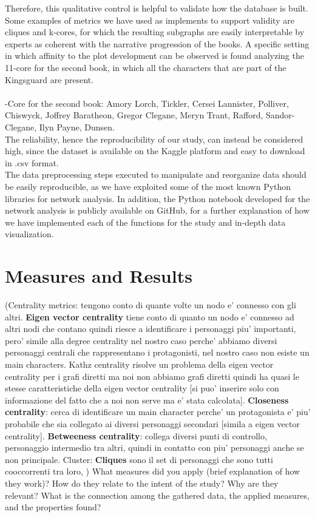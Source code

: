 \documentclass[12pt, a4paper]{article}
\begin{document}
Therefore, this qualitative control is helpful to validate how the database is built.
Some examples of metrics we have used as implements to support validity are cliques and k-cores, for which the resulting subgraphs are easily interpretable by experts as coherent with the narrative progression of the books.
A specific setting in which affinity to the plot development can be observed is found analyzing the 11-core for the second book, in which all the characters that are part of the Kingsguard are present. \\
\\
{\fontsize{9}{11}-Core for the second book: Amory Lorch, Tickler, Cersei Lannister, Polliver, Chiswyck, Joffrey Baratheon, Gregor Clegane, Meryn Trant, Rafford, Sandor-Clegane, Ilyn Payne, Dunsen.
}
\\

The reliability, hence the reproducibility of our study, can instead be considered high, since the dataset is available on the Kaggle platform and easy to download in .csv format.\\ 
The data preprocessing steps executed to manipulate and reorganize data should be easily reproducible, as we have exploited some of the most known Python libraries for network analysis. 
In addition, the Python notebook developed for the network analysis is publicly available on GitHub, for a further explanation of how we have implemented each of the functions for the study and in-depth data visualization.
\section{Measures and Results}
\label{measures}
(Centrality metrics: tengono conto di quante volte un nodo e' connesso con gli altri. \textbf{Eigen vector centrality} tiene conto di quanto un nodo e' connesso ad altri nodi che contano quindi riesce a identificare i personaggi piu' importanti, pero' simile alla degree centrality nel nostro caso perche' abbiamo diversi personaggi centrali che rappresentano i protagonisti, nel nostro caso non esiste un main characters. Kathz centrality risolve un problema della eigen vector centrality per i grafi diretti ma noi non abbiamo grafi diretti quindi ha quasi le stesse caratteristiche della eigen vector centrality [si puo' inserire solo con informazione del fatto che a noi non serve ma e' stata calcolata].
\textbf{Closeness centrality}: cerca di identificare un main character perche' un protagonista e' piu' probabile che sia collegato ai diversi personaggi secondari [simila a eigen vector centrality].
\textbf{Betweeness centrality}: collega diversi punti di controllo, personaggio intermedio tra altri, quindi in contatto con piu' personaggi anche se non principale.
\medskip
Cluster: \textbf{Cliques} sono il set di personaggi che sono tutti cooccorrenti tra loro, )
What measures did you apply (brief explanation of how they work)? How do
they relate to the intent of the study? Why are they relevant? What is the connection among the gathered data, the applied measures,
and the properties found?
\end{document}
